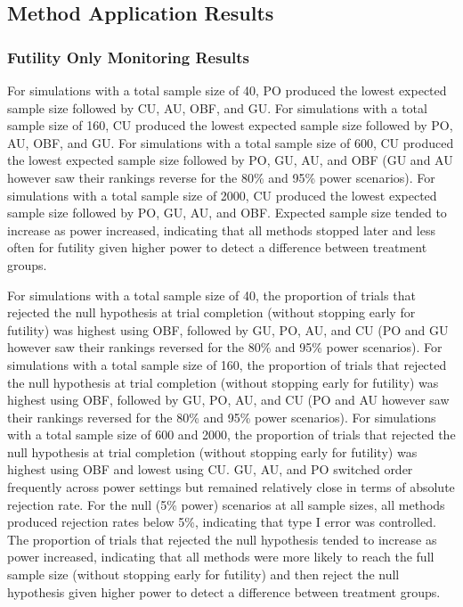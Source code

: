 \documentclass[Afour,sageh,times,square,numbers]{sagej}
\begin{document}
\subsection{Method Application Results}

\subsubsection{Futility Only Monitoring Results}

For simulations with a total sample size of 40, PO produced the lowest expected sample size followed by CU, AU, OBF, and GU.  For simulations with a total sample size of 160, CU produced the lowest expected sample size followed by PO, AU, OBF, and GU.  For simulations with a total sample size of 600, CU produced the lowest expected sample size followed by PO, GU, AU, and OBF (GU and AU however saw their rankings reverse for the 80\% and 95\% power scenarios).  For simulations with a total sample size of 2000, CU produced the lowest expected sample size followed by PO, GU, AU, and OBF.  Expected sample size tended to increase as power increased, indicating that all methods stopped later and less often for futility given higher power to detect a difference between treatment groups. 

For simulations with a total sample size of 40, the proportion of trials that rejected the null hypothesis at trial completion (without stopping early for futility) was highest using OBF, followed by GU, PO, AU, and CU (PO and GU however saw their rankings reversed for the 80\% and 95\% power scenarios).  For simulations with a total sample size of 160, the proportion of trials that rejected the null hypothesis at trial completion (without stopping early for futility) was highest using OBF, followed by GU, PO, AU, and CU (PO and AU however saw their rankings reversed for the 80\% and 95\% power scenarios).  For simulations with a total sample size of 600 and 2000, the proportion of trials that rejected the null hypothesis at trial completion (without stopping early for futility) was highest using OBF and lowest using CU.  GU, AU, and PO switched order frequently across power settings but remained relatively close in terms of absolute rejection rate.  For the null (5\% power) scenarios at all sample sizes, all methods produced rejection rates below 5\%, indicating that type I error was controlled.  The proportion of trials that rejected the null hypothesis tended to increase as power increased, indicating that all methods were more likely to reach the full sample size (without stopping early for futility) and then reject the null hypothesis given higher power to detect a difference between treatment groups.
\end{document}
